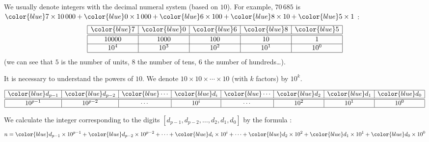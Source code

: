 \documentclass[11pt,class=report,crop=false]{standalone}
\begin{document}





\begin{cours}


We usually denote integers with the decimal numeral system (based on $10$). For example, $70\,685$ is 
${\color{blue}7} \times 10\,000
+{\color{blue}0} \times 1\,000
+{\color{blue}6} \times 100
+{\color{blue}8} \times 10 
+{\color{blue}5} \times 1$ : 
$$
\begin{array}{|c|c|c|c|c|}
  \hline
  {\color{blue}7} & {\color{blue}0} & {\color{blue}6} & {\color{blue}8} & {\color{blue}5} \\ 
  \hline\hline
  10000 & 1000 & 100 & 10 & 1 \\\hline
  10^4 & 10^3 & 10^2 & 10^1 & 10^0 \\
  \hline
\end{array}
$$   
(we can see that $5$ is the number of units, $8$ the number of tens, $6$ the number of hundreds\ldots). 

It is necessary to understand the powers of $10$. We denote $10 \times 10 \times \cdots \times 10$ (with $k$ factors) by $10^k$.

$$
\begin{array}{|c|c|c|c|c|c|c|c|}
  \hline
  {\color{blue}d_{p-1}} & {\color{blue}d_{p-2}}& {\color{blue}\cdots} & {\color{blue}d_i}& {\color{blue}\cdots} & {\color{blue}d_2} & {\color{blue}d_1} & {\color{blue}d_0} \\ 
  \hline\hline
  10^{p-1} & 10^{p-2} & \cdots & 10^i &\cdots & 10^2 & 10^1 & 10^0 \\
  \hline
\end{array}
$$   
  
We calculate the integer corresponding to the digits $[d_{p-1},d_{p-2}, \ldots,d_2,d_1,d_0]$ by the formula :
$$n = {\color{blue}d_{p-1}} \times 10^{p-1} + {\color{blue}d_{p-2}} \times 10^{p-2} + \cdots + {\color{blue}d_i} \times 10^{i} +  \cdots + {\color{blue}d_2} \times 10^2 + {\color{blue}d_1} \times 10^1 + {\color{blue}d_0} \times 10^0$$
\end{cours}
\end{document}
